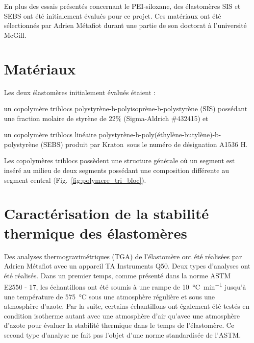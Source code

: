 \label{sec:Annexe_A}

En plus des essais présentés concernant le PEI-siloxane, des élastomères SIS et SEBS ont été initialement évalués pour ce projet. 
Ces matériaux ont été sélectionnés par Adrien Métafiot durant une partie de son doctorat à l'université McGill. 

\section*{Matériaux}

Les deux élastomères initialement évalués étaient : 
\begin{inparaenum}[]
	\item un copolymère triblocs polystyrène-b-polyisoprène-b-polystyrène (SIS) possédant une fraction molaire de styrène de 22\% (Sigma-Aldrich \#432415) et 
	\item un copolymère triblocs linéaire polystyrène-b-poly(éthylène-butylène)-b-polystyrène (SEBS) produit par Kraton\textregistered \ sous le numéro de désignation A1536 H. 
\end{inparaenum}
Les copolymères triblocs possèdent une structure générale où un segment est inséré au milieu de deux segments possédant une composition différente au segment central (Fig.~\ref{fig:polymere_tri_bloc}). 

\section*{Caractérisation de la stabilité thermique des élastomères}

Des analyses thermogravimétriques (TGA) de l'élastomère ont été réalisées par Adrien Métafiot avec un appareil TA Instruments Q50. 
Deux types d'analyses ont été réalisés. 
Dans un premier temps, comme présenté dans la norme ASTM E2550 - 17, les échantillons ont été soumis à une rampe de \SI[locale=FR]{10}{\celsius\per\minute} jusqu'à une température de \SI[locale=FR]{575}{\celsius} sous une atmosphère régulière et sous une atmosphère d'azote. 
Par la suite, certains échantillons ont également été testés en condition isotherme autant avec une atmosphère d'air qu'avec une atmosphère d'azote pour évaluer la stabilité thermique dans le temps de l'élastomère. 
Ce second type d'analyse ne fait pas l'objet d'une norme standardisée de l'ASTM. 

